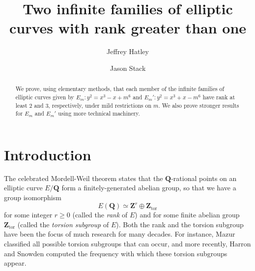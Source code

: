\documentclass{amsart}
\numberwithin{equation}{section}
\theoremstyle{remark}
\newcommand{\Z}{\mathbf{Z}}
\newcommand{\Q}{\mathbf{Q}}
\begin{document}
\title[Two infinite families with rank $>1$]{Two infinite families of elliptic curves with rank greater than one}

\author[J.~Hatley]{Jeffrey Hatley}
\address[Hatley]{
Department of Mathematics\\
Union College\\
Bailey Hall 202\\
Schenectady, NY 12308\\
USA}

\author[J.~Stack]{Jason Stack}
\address[Stack]{
Department of Mathematics\\
Union College\\
Bailey Hall 202\\
Schenectady, NY 12308\\
USA}



\begin{abstract}
We prove, using elementary methods, that each member of the infinite families of elliptic curves given by $E_m
\colon y^2=x^3 - x + m^6$ and $E_m'
\colon y^2=x^3 + x - m^6$ have rank at least $2$ and 3, respectively, under mild restrictions on $m$. We also prove stronger results for $E_m$ and $E_m'$ using more technical machinery.
\end{abstract}



\maketitle

\section{Introduction}\label{section:intro}

The celebrated Mordell-Weil theorem states that the $\Q$-rational points on an elliptic curve $E/\Q$ form a finitely-generated abelian group, so that we have a group isomorphism
\begin{equation*}
E(\Q) \simeq \Z^r \oplus \Z_{\mathrm{tor}}
\end{equation*}
for some integer $r \geq 0$ (called the \textit{rank} of $E$) and for some finite abelian group $\Z_{\mathrm{tor}}$ (called the \textit{torsion subgroup} of $E$). Both the rank and the torsion subgroup have been the focus of much research for many decades. For instance, Mazur \cite{Mazur-ideal} classified all possible torsion subgroups that can occur, and more recently, Harron and Snowden \cite{HarronSnowden} computed the frequency with which these torsion subgroups appear.
\end{document}
